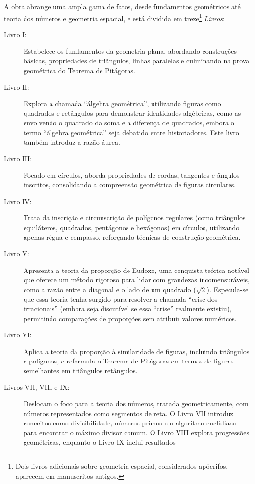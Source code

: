 \documentclass{hipatia}
\begin{document}
A obra abrange uma ampla
gama de fatos, desde fundamentos geométricos até
teoria dos números e geometria espacial, e está  
dividida em treze\footnote{Dois livros adicionais 
sobre geometria espacial, considerados 
apócrifos, aparecem em manuscritos antigos.} \emph{Livros}:
\begin{description}
	\item[Livro I:] Estabelece os fundamentos da geometria
		plana, abordando construções básicas, propriedades de
		triângulos, linhas paralelas e culminando na prova
		geométrica do Teorema de Pitágoras.
	\item[Livro II:] Explora a chamada ``álgebra
		geométrica'', utilizando figuras como quadrados e
		retângulos para demonstrar identidades algébricas,
		como as envolvendo o quadrado da soma e a diferença de
		quadrados, embora o termo ``álgebra geométrica'' seja
		debatido entre historiadores. 
		Este livro também introduz a razão áurea.
	\item[Livro III:] Focado em círculos, aborda
		propriedades de cordas, tangentes e ângulos inscritos,
		consolidando a compreensão geométrica de figuras
		circulares.
	\item[Livro IV:] Trata da inscrição e circunscrição de
		polígonos regulares (como triângulos equiláteros,
		quadrados, pentágonos e hexágonos) em círculos,
		utilizando apenas régua e compasso, reforçando
		técnicas de construção geométrica.
	\item[Livro V:] Apresenta a teoria da proporção de
		Eudoxo, uma conquista teórica notável que oferece um
		método rigoroso para lidar com grandezas
		incomensuráveis, como a razão entre a diagonal e o
		lado de um quadrado ($\sqrt{2}$). 
		Especula-se que essa teoria tenha surgido para
		resolver a chamada ``crise dos irracionais'' (embora seja
		discutível se essa ``crise'' realmente existiu),
		permitindo comparações de proporções sem atribuir
		valores numéricos.
	\item[Livro VI:] Aplica a teoria da proporção à
		similaridade de figuras, incluindo triângulos e
		polígonos, e reformula o Teorema de Pitágoras em
		termos de 
		figuras semelhantes em triângulos retângulos.
	\item[Livros VII, VIII e IX:] Deslocam o foco para a
		teoria dos números, tratada geometricamente, com
		números representados como segmentos de reta. O Livro
		VII introduz conceitos como divisibilidade, números
		primos e o algoritmo euclidiano para encontrar o
		máximo divisor comum. O Livro VIII explora progressões
		geométricas, enquanto o Livro IX inclui resultados

\end{description}
\end{document}
